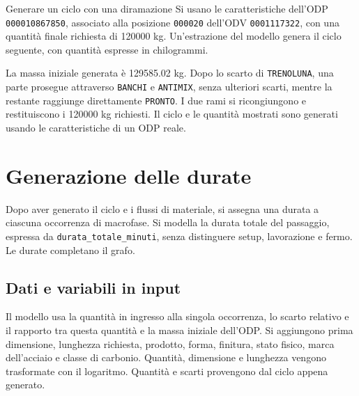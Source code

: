 \begingroup
{}
\begin{examplebox}{Generare un ciclo con una diramazione}
Si usano le caratteristiche dell'ODP \texttt{000010867850}, associato alla posizione \texttt{000020} dell'ODV \texttt{0001117322}, con una quantità finale richiesta di \num{120000} kg. Un'estrazione del modello genera il ciclo seguente, con quantità espresse in chilogrammi.

\begin{center}
\reportfigurecontent{}
\end{center}

La massa iniziale generata è \num{129585.02} kg. Dopo lo scarto di \texttt{TRENOLUNA}, una parte prosegue attraverso \texttt{BANCHI} e \texttt{ANTIMIX}, senza ulteriori scarti, mentre la restante raggiunge direttamente \texttt{PRONTO}. I due rami si ricongiungono e restituiscono i \num{120000} kg richiesti. Il ciclo e le quantità mostrati sono generati usando le caratteristiche di un ODP reale.
\end{examplebox}
\endgroup

\section{Generazione delle durate}
\label{sec:duration-generation}

Dopo aver generato il ciclo e i flussi di materiale, si assegna una durata a ciascuna occorrenza di macrofase. Si modella la durata totale del passaggio, espressa da \texttt{durata\_totale\_minuti}, senza distinguere setup, lavorazione e fermo. Le durate completano il grafo.

\subsection{Dati e variabili in input}
\label{sec:duration-generation-data}

Il modello usa la quantità in ingresso alla singola occorrenza, lo scarto relativo e il rapporto tra questa quantità e la massa iniziale dell'ODP. Si aggiungono prima dimensione, lunghezza richiesta, prodotto, forma, finitura, stato fisico, marca dell'acciaio e classe di carbonio. Quantità, dimensione e lunghezza vengono trasformate con il logaritmo. Quantità e scarti provengono dal ciclo appena generato.

